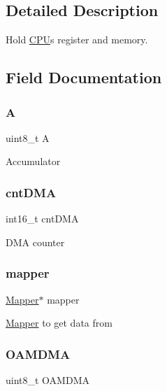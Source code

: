 \subsection{Detailed Description}
Hold \hyperlink{struct_c_p_u}{C\+PU}\textquotesingle{}s register and memory. 

\subsection{Field Documentation}
\mbox{\label{struct_c_p_u_aa99de428bd3e7715b73b335a5af9e900}} 
\subsubsection{\texorpdfstring{A}{A}}
{\footnotesize\ttfamily uint8\+\_\+t A}

Accumulator \mbox{\label{struct_c_p_u_a5e42ea87358490e9b0240807c963a734}} 
\subsubsection{\texorpdfstring{cnt\+D\+MA}{cntDMA}}
{\footnotesize\ttfamily int16\+\_\+t cnt\+D\+MA}

D\+MA counter \mbox{\label{struct_c_p_u_a2a9230344a369ccd1d395edd03dd6827}} 
\subsubsection{\texorpdfstring{mapper}{mapper}}
{\footnotesize\ttfamily \hyperlink{struct_mapper}{Mapper}$\ast$ mapper}

\hyperlink{struct_mapper}{Mapper} to get data from \mbox{\label{struct_c_p_u_a82fee18d426d3096d23e36cf11ee1995}} 
\subsubsection{\texorpdfstring{O\+A\+M\+D\+MA}{OAMDMA}}
{\footnotesize\ttfamily uint8\+\_\+t O\+A\+M\+D\+MA}

